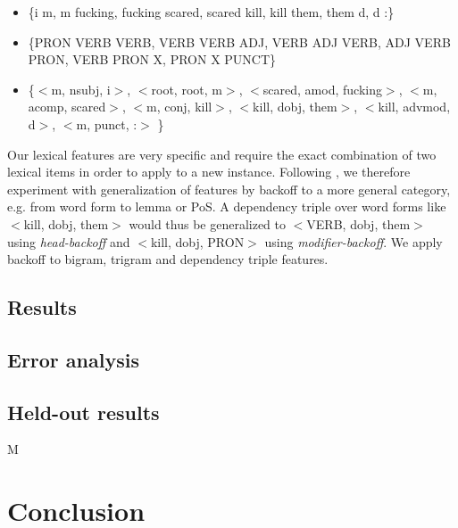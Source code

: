 \documentclass[11pt,letterpaper]{article}
\begin{document}
\begin{itemize}
\setlength\itemsep{0em}
\item \{i m,  m fucking, fucking scared, scared kill, kill them,  them d,  d :\}

\item \{PRON VERB VERB, VERB VERB ADJ, VERB ADJ VERB, ADJ VERB PRON,  VERB PRON X,  PRON X PUNCT\}

\item \{$<$m, nsubj, i$>$, $<$root, root, m$>$, $<$scared, amod, fucking$>$, $<$m, acomp, scared$>$, $<$m, conj, kill$>$, $<$kill, dobj, them$>$, $<$kill, advmod, d$>$, $<$m, punct, :$>$ \}
\end{itemize}
Our lexical features are very specific and require the exact
combination of two lexical items in order to apply to a new instance.
Following , we therefore experiment with
generalization of features by backoff to a more general category,
e.g. from word form to lemma or PoS. A dependency triple over word
forms like $<$kill, dobj, them$>$ would thus be generalized to
$<$VERB, dobj, them$>$ using \emph{head-backoff} and $<$kill, dobj,
PRON$>$ using \emph{modifier-backoff}. We apply backoff to bigram,
trigram and dependency triple features.
\subsection{Results}

\subsection{Error analysis}

\subsection{Held-out results}M

\section{Conclusion}
\label{sec:disc}



\end{document}
